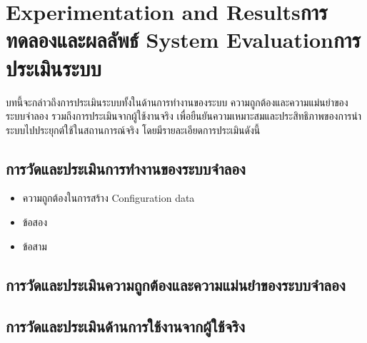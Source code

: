 \chapter{\ifproject%
\ifenglish Experimentation and Results\else การทดลองและผลลัพธ์\fi
\else%
\ifenglish System Evaluation\else การประเมินระบบ\fi
\fi}
\begin{mypara}
    \indent บทนี้จะกล่าวถึงการประเมินระบบทั้งในด้านการทำงานของระบบ ความถูกต้องและความแม่นยำของระบบจำลอง 
    รวมถึงการประเมินจากผู้ใช้งานจริง เพื่อยืนยันความเหมาะสมและประสิทธิภาพของการนำระบบไปประยุกต์ใช้ในสถานการณ์จริง
    โดยมีรายละเอียดการประเมินดังนี้
\end{mypara}

\section{การวัดและประเมินการทำงานของระบบจำลอง}
\begin{itemize}
  \item ความถูกต้องในการสร้าง Configuration data
  
  \item ข้อสอง
  \item ข้อสาม
\end{itemize}
\section{การวัดและประเมินความถูกต้องและความแม่นยำของระบบจำลอง}
\section{การวัดและประเมินด้านการใช้งานจากผู้ใช้จริง}